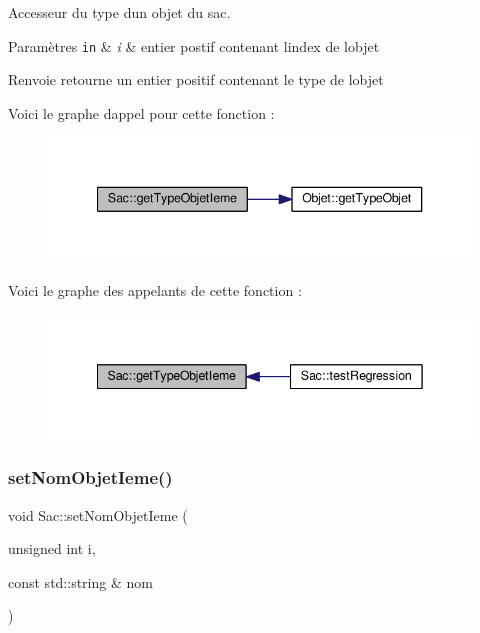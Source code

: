 Accesseur du type d\textquotesingle{}un objet du sac. 


\begin{DoxyParams}[1]{Paramètres}
\mbox{\tt in}  & {\em i} & entier postif contenant l\textquotesingle{}index de l\textquotesingle{}objet \\
\hline
\end{DoxyParams}
\begin{DoxyReturn}{Renvoie}
retourne un entier positif contenant le type de l\textquotesingle{}objet 
\end{DoxyReturn}
Voici le graphe d\textquotesingle{}appel pour cette fonction \+:\nopagebreak
\begin{figure}[H]
\begin{center}
\leavevmode
\includegraphics[width=340pt]{class_sac_a051e0f7f295c899a0af5cfb8f82b0483_cgraph}
\end{center}
\end{figure}
Voici le graphe des appelants de cette fonction \+:\nopagebreak
\begin{figure}[H]
\begin{center}
\leavevmode
\includegraphics[width=342pt]{class_sac_a051e0f7f295c899a0af5cfb8f82b0483_icgraph}
\end{center}
\end{figure}
\mbox{\label{class_sac_a67fa840e9b489995f7df6a9ed2acdb48}} 
\subsubsection{\texorpdfstring{set\+Nom\+Objet\+Ieme()}{setNomObjetIeme()}}
{\footnotesize\ttfamily void Sac\+::set\+Nom\+Objet\+Ieme (\begin{DoxyParamCaption}\item[{unsigned int}]{i,  }\item[{const std\+::string \&}]{nom }\end{DoxyParamCaption})}




